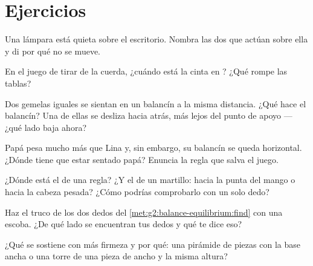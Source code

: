 \section{Ejercicios}

\begin{exercise}[$\star$]\label{exo:g2:balance-equilibrium:1}
Una lámpara está quieta sobre el escritorio. Nombra las dos 
que actúan sobre ella y di por qué no se mueve.
\end{exercise}

\begin{exercise}[$\star$]\label{exo:g2:balance-equilibrium:2}
En el juego de tirar de la cuerda, ¿cuándo está la cinta en
? ¿Qué rompe las tablas?
\end{exercise}

\begin{exercise}[$\star$]\label{exo:g2:balance-equilibrium:3}
Dos gemelas iguales se sientan en un balancín a la misma distancia.
¿Qué hace el balancín? Una de ellas se desliza hacia atrás, más lejos
del punto de apoyo --- ¿qué lado baja ahora?
\end{exercise}

\begin{exercise}[$\star$]\label{exo:g2:balance-equilibrium:4}
Papá pesa mucho más que Lina y, sin embargo, su balancín se queda
horizontal. ¿Dónde tiene que estar sentado papá? Enuncia la regla que
salva el juego.
\end{exercise}

\begin{exercise}[$\star$]\label{exo:g2:balance-equilibrium:5}
¿Dónde está el  de una regla? ¿Y el de un martillo:
hacia la punta del mango o hacia la cabeza pesada? ¿Cómo podrías
comprobarlo con un solo dedo?
\end{exercise}

\begin{exercise}[$\star$]\label{exo:g2:balance-equilibrium:6}
Haz el truco de los dos dedos del
\cref{met:g2:balance-equilibrium:find} con una escoba. ¿De qué lado se
encuentran tus dedos y qué te dice eso?
\end{exercise}

\begin{exercise}[$\star$]\label{exo:g2:balance-equilibrium:7}
¿Qué se sostiene con más firmeza y por qué: una pirámide de piezas con
la base ancha o una torre de una pieza de ancho y la misma altura?
\end{exercise}

